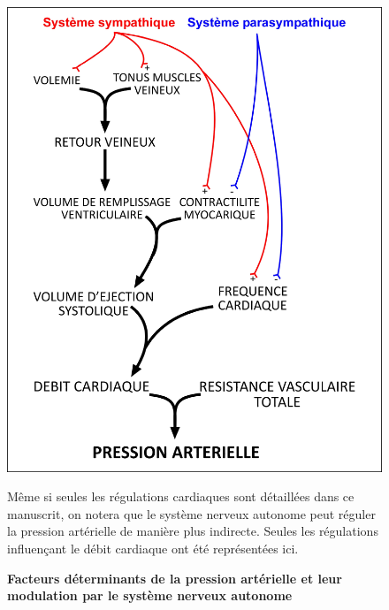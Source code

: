 \documentclass[a4paper,12pt,twoside]{report}
\begin{document}
\begin{figure}[h]

\begin{center}
 \includegraphics[scale=0.5]{Figure6.jpg} 
\end{center}

\caption[Facteurs déterminants de la pression artérielle et leur modulation par le système nerveux autonome]{\textbf{Facteurs déterminants de la pression artérielle et leur modulation par le système nerveux autonome}}

{\protect\parbox[t]{18cm}{
\begin{small}
Même si seules les régulations cardiaques sont détaillées dans ce manuscrit, on notera que le système nerveux autonome peut réguler la pression artérielle de manière plus indirecte. Seules les régulations influençant le débit cardiaque ont été représentées ici.
\end{small}}}

\label{Figure 6}

\end{figure}
\end{document}
